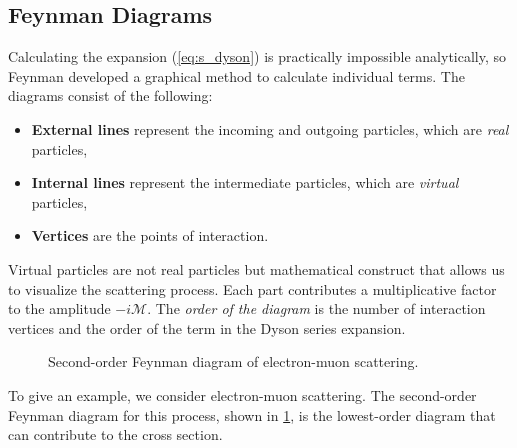 \subsection{Feynman Diagrams}
\label{sec:feyman}
Calculating the expansion (\ref{eq:s_dyson}) is practically impossible analytically, so Feynman developed a graphical method to calculate individual terms.
The diagrams consist of the following:
\begin{itemize}
    \item \textbf{External lines} represent the incoming and outgoing particles, which are \emph{real} particles,
    \item \textbf{Internal lines} represent the intermediate particles, which are \emph{virtual} particles,
    \item \textbf{Vertices} are the points of interaction.    
\end{itemize}
Virtual particles are not real particles but mathematical construct that allows us to visualize the scattering process.
Each part contributes a multiplicative factor to the amplitude $-i\mathcal{M}$.
The \emph{order of the diagram} is the number of interaction vertices and the order of the term in the Dyson series expansion.

\begin{figure}[htb]
\caption{Second-order Feynman diagram of electron-muon scattering.}
\label{fig:electron_muon}
\end{figure}
To give an example, we consider electron-muon scattering.
The second-order Feynman diagram for this process, shown in \cref{fig:electron_muon}, is the lowest-order diagram that can contribute to the cross section.

